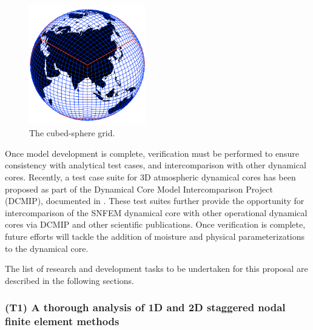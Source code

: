 \documentclass[11pt]{article}
\begin{document}
\begin{figure}
\begin{center}
\includegraphics[width=2in]{A_CubedSphere}
\end{center}
\caption{The cubed-sphere grid.} \label{fig:CubedSphere}
\end{figure}

Once model development is complete, verification must be performed to ensure consistency with analytical test cases, and intercomparison with other dynamical cores.  Recently, a test case suite for 3D atmospheric dynamical cores has been proposed as part of the Dynamical Core Model Intercomparison Project (DCMIP), documented in \cite{DCMIP2012TESTCASES, kent2013dynamical}.  These test suites further provide the opportunity for intercomparison of the SNFEM dynamical core with other operational dynamical cores via DCMIP and other scientific publications.  Once verification is complete, future efforts will tackle the addition of moisture and physical parameterizations to the dynamical core.

The list of research and development tasks to be undertaken for this proposal are described in the following sections.

\subsubsection{(T1) A thorough analysis of 1D and 2D staggered nodal finite element methods} \label{sec:AnalysisSNFEM}

\end{document}
